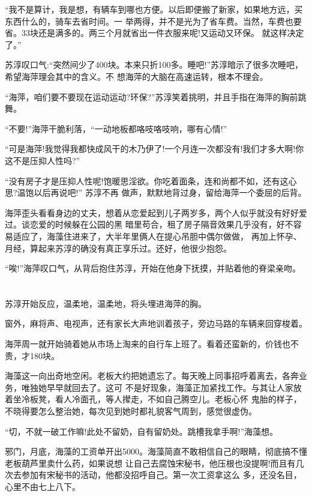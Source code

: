 \documentclass[11pt,a4paper,onecolumn]{article}
\begin{document}
``我不是算计，我是想，有辆车到哪也方便。以后即便搬了新家，如果地方远，买东西什么的，骑车去省时间。一
举两得，并不是光为了省车费。当然，车费也要省。33块还是满多的。两三个月就省出一件衣服来呢!又运动又环保。
就这样决定了。''

苏淳叹口气:``突然间少了400块。本来只折100多。睡吧!''苏淳暗示了很多次睡吧，希望海萍理会其中的含义。不
想海萍的大脑在高速运转，根本不理会。

``海萍，咱们要不要现在运动运动?环保?''苏淳笑着挑明，并且手指在海萍的胸前跳舞。

``不要!''海萍干脆利落，``一动地板都咯吱咯吱响，哪有心情!''

``可是海萍!我觉得我都快成风干的木乃伊了!一个月连一次都没有!我们才多大啊!你这不是压抑人性吗?''

``没有房子才是压抑人性呢!饱暖思淫欲。你吃着面条，连和尚都不如，还有这心思?温饱以后再说吧!'' 苏淳不再
做声，默默地背过身，留给海萍一个委屈的后背。

海萍歪头看看身边的丈夫，想着从恋爱起到儿子两岁多，两个人似乎就没有好好爱过。谈恋爱的时候躲在公园的黑
暗里苟合，租了房子隔音效果几乎没有，好不容易适应了，海藻住进来了，大半年里俩人在提心吊胆中偶尔做做，
再加上怀孕、月经，算起来苏淳的确没有真正享乐过。还好，他很少抱怨。

``唉!''海萍叹口气，从背后抱住苏淳，开始在他身下抚摸，并贴着他的脊梁亲吻。

\section[\thesection]{}

苏淳开始反应，温柔地，温柔地，将头埋进海萍的胸。

窗外，麻将声、电视声，还有家长大声地训着孩子，旁边马路的车辆来回穿梭着。

海萍周一就开始骑着她从市场上淘来的自行车上班了。看着还蛮新的，价钱也不贵，才180块。

海藻这一向出奇地空闲。老板大约把她遗忘了。每天晚上同事招呼着离去，各奔业务，唯独她早早就回去了。这可
不是好现象，海藻正加紧找工作。与其让人家放着坐冷板凳，看人冷面孔，等人撵走，不如自己腾空儿。老板心怀
鬼胎的样子，不晓得要怎么整治她，每次见到她时都礼貌客气周到，感觉很虚伪。

``切，不就一破工作嘛!此处不留奶，自有留奶处。跳槽我拿手啊!''海藻想。

邪门，月底，海藻的工资单开出5000。海藻简直不敢相信自己的眼睛，彻底搞不懂老板葫芦里卖什么药，如果说想
让自己去腐蚀宋秘书，他压根也没提啊!而且有几次去参加有宋秘书的活动，他都没招呼自己。第一次工资拿这么
多，还没名目，心里不由七上八下。
\end{document}
